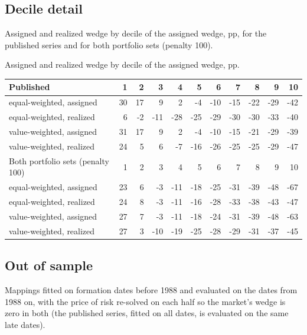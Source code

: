 \documentclass[11pt]{article}
\begin{document}
\subsection*{Decile detail}

Assigned and realized wedge by decile of the assigned wedge, pp, for the
published series and for both portfolio sets (penalty 100).

\begin{tbl}{Assigned and realized wedge by decile of the assigned wedge, pp.}
\begin{tabular}{lrrrrrrrrrr}\toprule
Published & 1 & 2 & 3 & 4 & 5 & 6 & 7 & 8 & 9 & 10\\\midrule
equal-weighted, assigned & 30 & 17 & 9 & 2 & -4 & -10 & -15 & -22 & -29 & -42\\
equal-weighted, realized & 6 & -2 & -11 & -28 & -25 & -29 & -30 & -30 & -33 & -40\\
value-weighted, assigned & 31 & 17 & 9 & 2 & -4 & -10 & -15 & -21 & -29 & -39\\
value-weighted, realized & 24 & 5 & 6 & -7 & -16 & -26 & -25 & -25 & -29 & -47\\
\midrule
Both portfolio sets (penalty 100) & 1 & 2 & 3 & 4 & 5 & 6 & 7 & 8 & 9 & 10\\\midrule
equal-weighted, assigned & 23 & 6 & -3 & -11 & -18 & -25 & -31 & -39 & -48 & -67\\
equal-weighted, realized & 24 & 8 & -3 & -11 & -16 & -28 & -33 & -38 & -43 & -47\\
value-weighted, assigned & 27 & 7 & -3 & -11 & -18 & -24 & -31 & -39 & -48 & -63\\
value-weighted, realized & 27 & 3 & -10 & -19 & -25 & -28 & -29 & -31 & -37 & -45\\
\bottomrule
\end{tabular}
\end{tbl}

\subsection*{Out of sample}

Mappings fitted on formation dates before 1988 and evaluated on the dates
from 1988 on, with the price of risk re-solved on each half so the market's
wedge is zero in both (the published series, fitted on all dates, is
evaluated on the same late dates).
\end{document}
